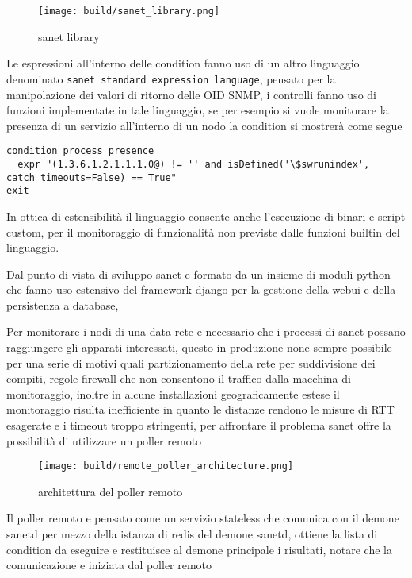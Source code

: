 \begin{figure}[H]
    \centering
    \texttt{[image: build/sanet\_library.png]}
    \caption{sanet library}
    \label{fig:enter-label}
\end{figure}

Le espressioni all'interno delle condition fanno uso di un altro linguaggio denominato \verb|sanet standard expression language|, pensato per la manipolazione dei valori di ritorno delle OID SNMP, i controlli fanno uso di funzioni implementate in tale linguaggio, se per esempio si vuole monitorare la presenza di un servizio all'interno di un nodo la condition si mostrerà come segue

\begin{lstlisting}
condition process_presence
  expr "(1.3.6.1.2.1.1.1.0@) != '' and isDefined('\$swrunindex', catch_timeouts=False) == True"
exit
\end{lstlisting}

In ottica di estensibilità il linguaggio consente anche l'esecuzione di binari e script custom, per il monitoraggio di funzionalità non previste dalle funzioni builtin del linguaggio.

Dal punto di vista di sviluppo sanet e formato da un insieme di moduli python che fanno uso estensivo del framework django per la gestione della webui e della persistenza a database,

Per monitorare i nodi di una data rete e necessario che i processi di sanet possano raggiungere gli apparati interessati, questo in produzione none sempre possibile per una serie di motivi quali partizionamento della rete per suddivisione dei compiti, regole firewall che non consentono il traffico dalla macchina di monitoraggio, inoltre in alcune installazioni geograficamente estese il monitoraggio risulta inefficiente in quanto le distanze rendono le misure di RTT esagerate e i timeout troppo stringenti, per affrontare il problema sanet offre la possibilità di utilizzare un poller remoto

\begin{figure}[H]
    \centering
    \texttt{[image: build/remote\_poller\_architecture.png]}
    \caption{architettura del poller remoto}
    \label{fig:enter-label} \end{figure}

Il poller remoto e pensato come un servizio stateless che comunica con il demone sanetd per mezzo della istanza di redis del demone sanetd, ottiene la lista di condition da eseguire e restituisce al demone principale i risultati, notare che la comunicazione e iniziata dal poller remoto


